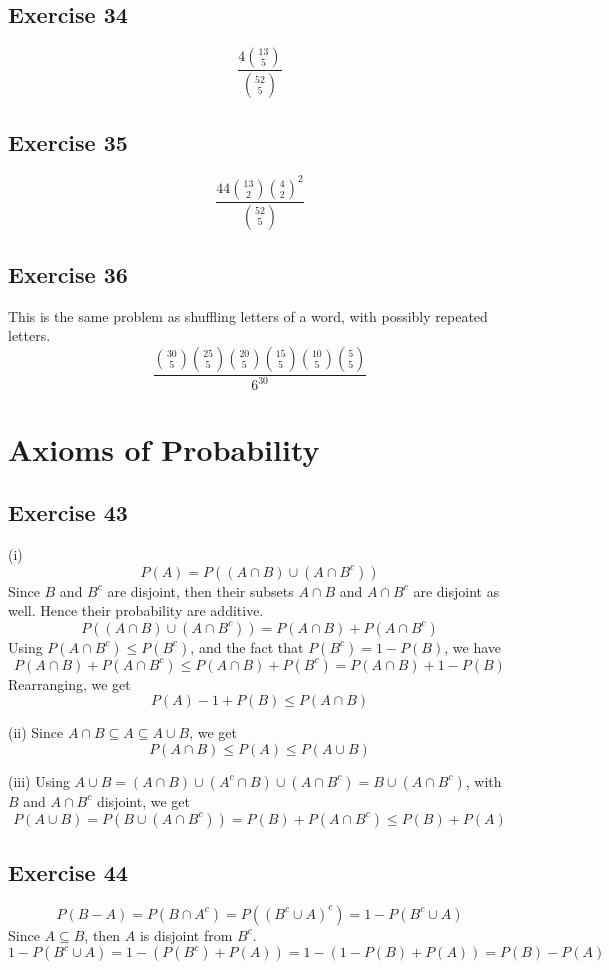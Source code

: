 \documentclass{book}
\begin{document}
\subsection*{Exercise 34}
$$\frac{4\binom{13}{5}}{\binom{52}{5}}$$

\subsection*{Exercise 35}
$$\frac{44\binom{13}{2}\binom{4}{2}^2}{\binom{52}{5}}$$

\subsection*{Exercise 36}
This is the same problem as shuffling letters of a word, with possibly repeated letters.
$$\frac{\binom{30}{5} \binom{25}{5} \binom{20}{5} \binom{15}{5} \binom{10}{5} \binom{5}{5}}{6^{30}}$$

\section{Axioms of Probability}

\subsection*{Exercise 43}
(i)
$$P(A) = P((A \cap B) \cup (A \cap B^c))$$
Since $B$ and $B^c$ are disjoint, then their subsets $A \cap B$ and $A \cap B^c$ are disjoint as well. Hence their probability are additive.
$$P((A \cap B) \cup (A \cap B^c)) = P(A \cap B) + P(A \cap B^c)$$
Using $P(A \cap B^c) \leq P(B^c)$, and the fact that $P(B^c) = 1 - P(B)$, we have
$$P(A \cap B) + P(A \cap B^c) \leq P(A \cap B) + P(B^c) = P(A \cap B) + 1 - P(B)$$
Rearranging, we get
$$P(A) - 1 + P(B) \leq P(A \cap B)$$

\noindent
(ii)
Since $A \cap B \subseteq A \subseteq A \cup B$, we get
$$P(A \cap B) \leq P(A) \leq P(A \cup B)$$

\noindent
(iii)
Using $A \cup B = (A \cap B) \cup (A^c \cap B) \cup (A \cap B^c) = B \cup (A \cap B^c)$, with $B$ and $A \cap B^c$ disjoint, we get
$$P(A \cup B) = P(B \cup (A \cap B^c)) = P(B) + P(A \cap B^c) \leq P(B) + P(A)$$

\subsection*{Exercise 44}
$$P(B - A) = P(B \cap A^c) = P((B^c \cup A)^c) = 1 - P(B^c \cup A)$$
Since $A \subseteq B$, then $A$ is disjoint from $B^c$.
$$1 - P(B^c \cup A) = 1 - (P(B^c) + P(A)) = 1 - (1 - P(B) + P(A)) = P(B) - P(A)$$
\end{document}
